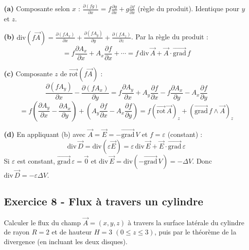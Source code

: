 \documentclass[12pt,a4paper]{article}
\begin{document}
\begin{boitecorrige}
\textbf{(a)} Composante selon $x$ : $\frac{\partial(fg)}{\partial x} = f\frac{\partial g}{\partial x}+g\frac{\partial f}{\partial x}$ (règle du produit). Identique pour $y$ et $z$.

\textbf{(b)} $\text{div}(f\vec{A}) = \frac{\partial(fA_x)}{\partial x}+\frac{\partial(fA_y)}{\partial y}+\frac{\partial(fA_z)}{\partial z}$. Par la règle du produit :
\[
= f\frac{\partial A_x}{\partial x}+A_x\frac{\partial f}{\partial x}+\cdots = f\,\text{div}\,\vec{A} + \vec{A}\cdot\overrightarrow{\text{grad}}\,f
\]

\textbf{(c)} Composante $z$ de $\overrightarrow{\text{rot}}(f\vec{A})$ :
\[
\frac{\partial(fA_y)}{\partial x}-\frac{\partial(fA_x)}{\partial y} = f\frac{\partial A_y}{\partial x}+A_y\frac{\partial f}{\partial x}-f\frac{\partial A_x}{\partial y}-A_x\frac{\partial f}{\partial y}
\]
\[
= f\left(\frac{\partial A_y}{\partial x}-\frac{\partial A_x}{\partial y}\right)+\left(A_y\frac{\partial f}{\partial x}-A_x\frac{\partial f}{\partial y}\right) = f(\overrightarrow{\text{rot}}\,\vec{A})_z + (\overrightarrow{\text{grad}}\,f\wedge\vec{A})_z
\]

\textbf{(d)} En appliquant (b) avec $\vec{A}=\vec{E}=-\overrightarrow{\text{grad}}\,V$ et $f=\varepsilon$ (constant) :
\[
\text{div}\,\vec{D} = \text{div}(\varepsilon\vec{E}) = \varepsilon\,\text{div}\,\vec{E}+\vec{E}\cdot\overrightarrow{\text{grad}}\,\varepsilon
\]
Si $\varepsilon$ est constant, $\overrightarrow{\text{grad}}\,\varepsilon = \vec{0}$ et $\text{div}\,\vec{E} = \text{div}(-\overrightarrow{\text{grad}}\,V) = -\Delta V$.
Donc $\text{div}\,\vec{D} = -\varepsilon\Delta V$.
\end{boitecorrige}

\subsection*{Exercice 8 - Flux à travers un cylindre \niveau{\moyen}}

\begin{boiteexercice}
Calculer le flux du champ $\vec{A} = (x, y, z)$ à travers la surface latérale du cylindre de rayon $R=2$ et de hauteur $H=3$ $(0\leq z\leq3)$, puis par le théorème de la divergence (en incluant les deux disques).
\end{boiteexercice}
\end{document}
